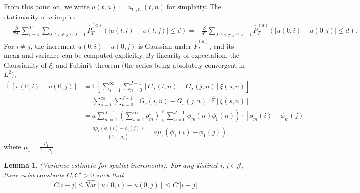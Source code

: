 \documentclass[12pt]{amsart}
\newtheorem{lemma}{Lemma}[section]
\numberwithin{equation}{section}
\newcommand{\E}{\mathbb{E}}
\newcommand{\1}{\mathbf{1}}
\begin{document}
From this point on, we write $u(t,n):=u_{t_0,n_0}(t,n)$ for simplicity. The stationarity of $u$ implies
\begin{equation}
\begin{split}
\label{total_penal}
    -\frac{\beta}{Td^\alpha}\sum_{t=1}^{T}\sum_{0\leq i\neq j\leq J-1}\widehat{P}_T^{(a)}(\vert u(t,i)-u(t,j)\vert\leq d) =-\frac{\beta}{d^\alpha}\sum_{0\leq i\neq j\leq J-1}\widehat{P}_T^{(a)}(\vert u(0,i)-u(0,j)\vert\leq d).
    \end{split}
\end{equation}
For $i\neq j$, the increment $u(0,i)-u(0,j)$ is Gaussian under $\widehat{P}_T^{(a)}$, and its mean and variance can be computed explicitly. By linearity of expectation, the Gaussianity of $\xi$, and Fubini's theorem (the series being absolutely convergent in $L^2$),
\begin{equation}
\begin{split}
\label{mean}
    \widehat{\E}[u(0,i)-u(0,j)]&=\E\left[\sum_{s=1}^\infty\sum_{n=0}^{J-1}[G_s(i,n)-G_s(j,n)]\xi(s,n)\right]\\
    &=\sum_{s=1}^\infty\sum_{n=0}^{J-1}[G_s(i,n)-G_s(j,n)]\widehat{\E}[\xi(s,n)]\\
    &=a\sum_{m=1}^{J-1}\left(\sum_{s=1}^\infty\rho_m^s\right)\left(\sum_{n=0}^{J-1}\phi_m(n)\phi_1(n)\right)\cdot\left[\phi_m(i)-\phi_m(j)\right]\\
    &=\frac{a\rho_1(\phi_1(i)-\phi_1(j))}{(1-\rho_1)}=a\mu_1(\phi_1(i)-\phi_1(j)),
\end{split}
\end{equation}
where $\mu_1 = \frac{\rho_1}{1-\rho_1}$. 

\begin{lemma}\label{varbound}(Variance estimate for spatial increments). For any distinct $i,j\in\mathcal{J}$, there exist constants $C,C'>0$ such that
    \begin{equation*}
        C\vert i-j\vert \leq \widehat{\text{Var}}[u(0,i)-u(0,j)]\leq C'\vert i-j\vert.
    \end{equation*}
\end{lemma}
\end{document}
